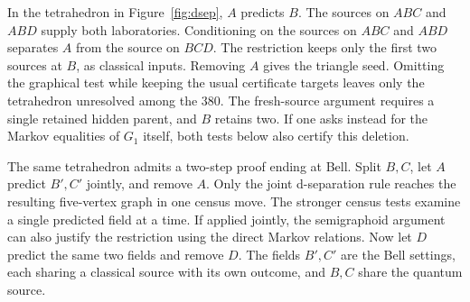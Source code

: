 In the tetrahedron in Figure~\ref{fig:dsep}, \(A\) predicts \(B\).
The sources on \(ABC\) and \(ABD\) supply both laboratories.
Conditioning on the sources on \(ABC\) and \(ABD\) separates \(A\) from
the source on \(BCD\).
The restriction keeps only the first two sources at \(B\), as classical
inputs. Removing \(A\) gives the triangle seed. Omitting the graphical
test while keeping the usual certificate targets leaves only the
tetrahedron unresolved among the 380. The fresh-source argument
requires a single retained hidden parent, and \(B\) retains two.
If one asks instead for the
Markov equalities of \(G_1\) itself, both tests below also certify
this deletion.

The same tetrahedron admits a two-step proof ending at Bell. Split
\(B,C\), let \(A\) predict \(B',C'\) jointly, and remove \(A\).
Only the joint d-separation rule reaches the resulting five-vertex graph
in one census move. The stronger census tests examine a single predicted
field at a time. If applied jointly, the semigraphoid argument can also
justify the restriction using the direct Markov relations. Now let \(D\) predict the same two fields and remove \(D\). The fields
\(B',C'\) are the Bell settings, each sharing a classical source with
its own outcome, and \(B,C\) share the quantum source.


